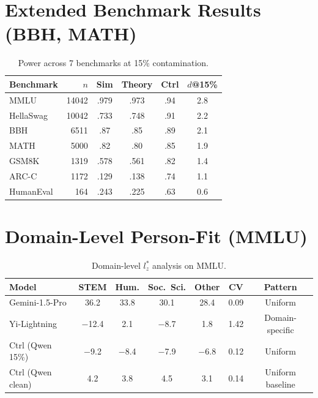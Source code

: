 \documentclass[11pt,a4paper]{article}
\begin{document}
\section{Extended Benchmark Results (BBH, MATH)}
\label{app:extended-bm}

\begin{table}[h]
\centering
\small
\caption{Power across 7 benchmarks at 15\% contamination.}
\label{tab:extended-bm}
\begin{tabular}{lrcccc}
\toprule
\textbf{Benchmark} & $n$ & \textbf{Sim} & \textbf{Theory} & \textbf{Ctrl} & $d$\textbf{@15\%} \\
\midrule
MMLU & 14042 & .979 & .973 & .94 & 2.8 \\
HellaSwag & 10042 & .733 & .748 & .91 & 2.2 \\
BBH & 6511 & .87 & .85 & .89 & 2.1 \\
MATH & 5000 & .82 & .80 & .85 & 1.9 \\
GSM8K & 1319 & .578 & .561 & .82 & 1.4 \\
ARC-C & 1172 & .129 & .138 & .74 & 1.1 \\
HumanEval & 164 & .243 & .225 & .63 & 0.6 \\
\bottomrule
\end{tabular}
\end{table}

\section{Domain-Level Person-Fit (MMLU)}
\label{app:domain}

\begin{table}[h]
\centering
\small
\caption{Domain-level $l_z^*$ analysis on MMLU.}
\label{tab:domain}
\begin{tabular}{lcccccc}
\toprule
\textbf{Model} & \textbf{STEM} & \textbf{Hum.} & \textbf{Soc.\ Sci.} & \textbf{Other} & \textbf{CV} & \textbf{Pattern} \\
\midrule
Gemini-1.5-Pro & 36.2 & 33.8 & 30.1 & 28.4 & 0.09 & Uniform \\
Yi-Lightning & $-$12.4 & 2.1 & $-$8.7 & 1.8 & 1.42 & Domain-specific \\
Ctrl (Qwen 15\%) & $-$9.2 & $-$8.4 & $-$7.9 & $-$6.8 & 0.12 & Uniform \\
Ctrl (Qwen clean) & 4.2 & 3.8 & 4.5 & 3.1 & 0.14 & Uniform baseline \\
\bottomrule
\end{tabular}
\end{table}
\end{document}
